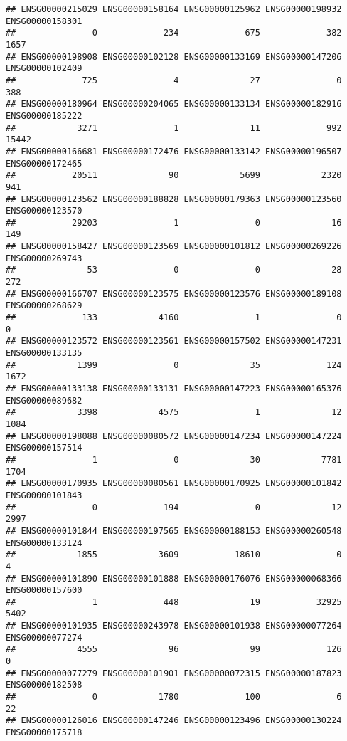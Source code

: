 \documentclass[
]{article}
\begin{document}
\begin{verbatim}
## ENSG00000215029 ENSG00000158164 ENSG00000125962 ENSG00000198932 ENSG00000158301 
##               0             234             675             382            1657 
## ENSG00000198908 ENSG00000102128 ENSG00000133169 ENSG00000147206 ENSG00000102409 
##             725               4              27               0             388 
## ENSG00000180964 ENSG00000204065 ENSG00000133134 ENSG00000182916 ENSG00000185222 
##            3271               1              11             992           15442 
## ENSG00000166681 ENSG00000172476 ENSG00000133142 ENSG00000196507 ENSG00000172465 
##           20511              90            5699            2320             941 
## ENSG00000123562 ENSG00000188828 ENSG00000179363 ENSG00000123560 ENSG00000123570 
##           29203               1               0              16             149 
## ENSG00000158427 ENSG00000123569 ENSG00000101812 ENSG00000269226 ENSG00000269743 
##              53               0               0              28             272 
## ENSG00000166707 ENSG00000123575 ENSG00000123576 ENSG00000189108 ENSG00000268629 
##             133            4160               1               0               0 
## ENSG00000123572 ENSG00000123561 ENSG00000157502 ENSG00000147231 ENSG00000133135 
##            1399               0              35             124            1672 
## ENSG00000133138 ENSG00000133131 ENSG00000147223 ENSG00000165376 ENSG00000089682 
##            3398            4575               1              12            1084 
## ENSG00000198088 ENSG00000080572 ENSG00000147234 ENSG00000147224 ENSG00000157514 
##               1               0              30            7781            1704 
## ENSG00000170935 ENSG00000080561 ENSG00000170925 ENSG00000101842 ENSG00000101843 
##               0             194               0              12            2997 
## ENSG00000101844 ENSG00000197565 ENSG00000188153 ENSG00000260548 ENSG00000133124 
##            1855            3609           18610               0               4 
## ENSG00000101890 ENSG00000101888 ENSG00000176076 ENSG00000068366 ENSG00000157600 
##               1             448              19           32925            5402 
## ENSG00000101935 ENSG00000243978 ENSG00000101938 ENSG00000077264 ENSG00000077274 
##            4555              96              99             126               0 
## ENSG00000077279 ENSG00000101901 ENSG00000072315 ENSG00000187823 ENSG00000182508 
##               0            1780             100               6              22 
## ENSG00000126016 ENSG00000147246 ENSG00000123496 ENSG00000130224 ENSG00000175718 

\end{verbatim}
\end{document}
